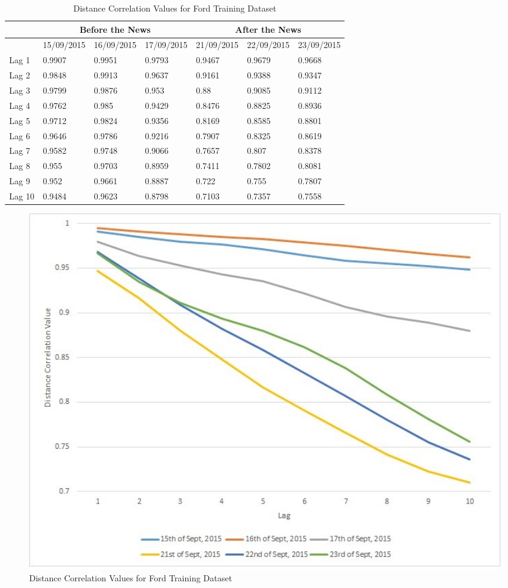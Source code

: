 \documentclass[13pt]{report}
\begin{document}
\begin{table}[H]
\centering
\label{forddcvtab}
\begin{tabular}{|l|l|l|l|l|l|l|}
\hline
       & \multicolumn{3}{c|}{Before the News} & \multicolumn{3}{c|}{After the News}  \\ \hline
       & 15/09/2015 & 16/09/2015 & 17/09/2015 & 21/09/2015 & 22/09/2015 & 23/09/2015 \\ \hline
Lag 1  & 0.9907     & 0.9951     & 0.9793     & 0.9467     & 0.9679     & 0.9668     \\ \hline
Lag 2  & 0.9848     & 0.9913     & 0.9637     & 0.9161     & 0.9388     & 0.9347     \\ \hline
Lag 3  & 0.9799     & 0.9876     & 0.953      & 0.88       & 0.9085     & 0.9112     \\ \hline
Lag 4  & 0.9762     & 0.985      & 0.9429     & 0.8476     & 0.8825     & 0.8936     \\ \hline
Lag 5  & 0.9712     & 0.9824     & 0.9356     & 0.8169     & 0.8585     & 0.8801     \\ \hline
Lag 6  & 0.9646     & 0.9786     & 0.9216     & 0.7907     & 0.8325     & 0.8619     \\ \hline
Lag 7  & 0.9582     & 0.9748     & 0.9066     & 0.7657     & 0.807      & 0.8378     \\ \hline
Lag 8  & 0.955      & 0.9703     & 0.8959     & 0.7411     & 0.7802     & 0.8081     \\ \hline
Lag 9  & 0.952      & 0.9661     & 0.8887     & 0.722      & 0.755      & 0.7807     \\ \hline
Lag 10 & 0.9484     & 0.9623     & 0.8798     & 0.7103     & 0.7357     & 0.7558     \\ \hline
\end{tabular}
\caption{Distance Correlation Values for Ford Training Dataset}
\end{table}

\begin{figure}[H]
\centering
\label{forddcvfig}
\includegraphics[width= 1\textwidth]{ford_distancecorrelation}
\caption{Distance Correlation Values for Ford Training Dataset}
\end{figure}
\end{document}
